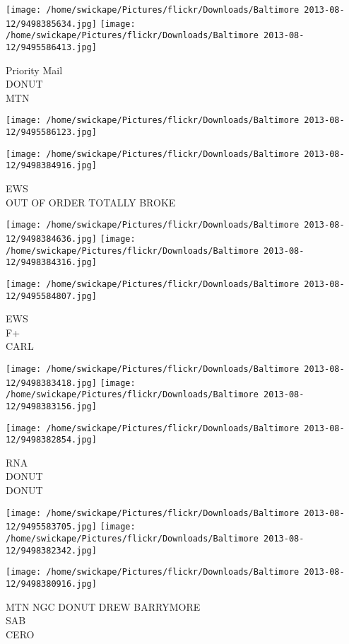\documentclass[10pt,letterpaper]{article}
\begin{document}
\vspace{0.25in}
\texttt{[image: /home/swickape/Pictures/flickr/Downloads/Baltimore 2013-08-12/9498385634.jpg]}
\texttt{[image: /home/swickape/Pictures/flickr/Downloads/Baltimore 2013-08-12/9495586413.jpg]}

Priority Mail\\
DONUT\\
MTN\\
\pagebreak

\texttt{[image: /home/swickape/Pictures/flickr/Downloads/Baltimore 2013-08-12/9495586123.jpg]}

\vspace{0.25in}
\texttt{[image: /home/swickape/Pictures/flickr/Downloads/Baltimore 2013-08-12/9498384916.jpg]}

EWS\\
OUT OF ORDER TOTALLY BROKE\\
\pagebreak

\texttt{[image: /home/swickape/Pictures/flickr/Downloads/Baltimore 2013-08-12/9498384636.jpg]}
\texttt{[image: /home/swickape/Pictures/flickr/Downloads/Baltimore 2013-08-12/9498384316.jpg]}

\vspace{0.25in}
\texttt{[image: /home/swickape/Pictures/flickr/Downloads/Baltimore 2013-08-12/9495584807.jpg]}

EWS\\
F+\\
CARL\\
\pagebreak

\texttt{[image: /home/swickape/Pictures/flickr/Downloads/Baltimore 2013-08-12/9498383418.jpg]}
\texttt{[image: /home/swickape/Pictures/flickr/Downloads/Baltimore 2013-08-12/9498383156.jpg]}

\vspace{0.25in}
\texttt{[image: /home/swickape/Pictures/flickr/Downloads/Baltimore 2013-08-12/9498382854.jpg]}

RNA\\
DONUT\\
DONUT\\
\pagebreak

\texttt{[image: /home/swickape/Pictures/flickr/Downloads/Baltimore 2013-08-12/9495583705.jpg]}
\texttt{[image: /home/swickape/Pictures/flickr/Downloads/Baltimore 2013-08-12/9498382342.jpg]}

\vspace{0.25in}
\texttt{[image: /home/swickape/Pictures/flickr/Downloads/Baltimore 2013-08-12/9498380916.jpg]}

MTN NGC DONUT DREW BARRYMORE\\
SAB\\
CERO\\
\pagebreak
\end{document}
